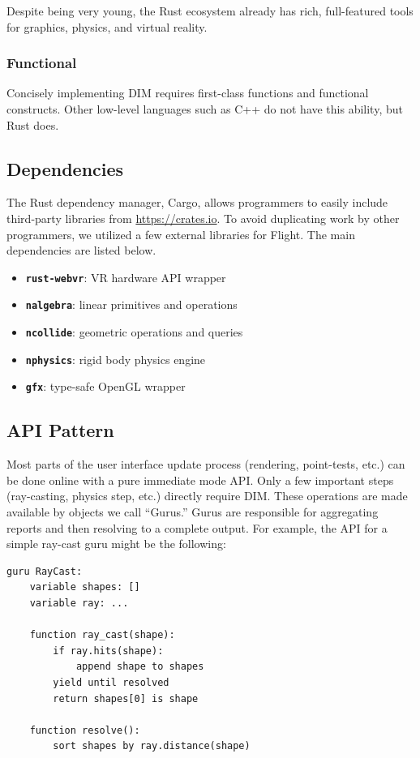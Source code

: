 \documentclass[conference,12pt]{IEEEtran}
\begin{document}
Despite being very young, the Rust ecosystem already has rich, full-featured
tools for graphics, physics, and virtual reality.

\subsubsection{Functional}

Concisely implementing DIM requires first-class functions and functional
constructs. Other low-level languages such as C++ do not have this ability, but
Rust does.

\subsection{Dependencies}

The Rust dependency manager, Cargo, allows programmers to easily include
third-party libraries from \url{https://crates.io}. To avoid duplicating work
by other programmers, we utilized a few external libraries for Flight. The main
dependencies are listed below.
\begin{itemize}
    \item \textbf{\texttt{rust-webvr}}: VR hardware API wrapper
    \item \textbf{\texttt{nalgebra}}: linear primitives and operations
    \item \textbf{\texttt{ncollide}}: geometric operations and queries
    \item \textbf{\texttt{nphysics}}: rigid body physics engine
    \item \textbf{\texttt{gfx}}: type-safe OpenGL wrapper
\end{itemize}

\subsection{API Pattern}

Most parts of the user interface update process (rendering, point-tests, etc.)
can be done online with a pure immediate mode API. Only a few important steps
(ray-casting, physics step, etc.) directly require DIM. These operations are
made available by objects we call ``Gurus.'' Gurus are responsible for
aggregating reports and then resolving to a complete output. For example, the
API for a simple ray-cast guru might be the following:

\begin{verbatim}
guru RayCast:
    variable shapes: []
    variable ray: ...

    function ray_cast(shape):
        if ray.hits(shape):
            append shape to shapes
        yield until resolved
        return shapes[0] is shape

    function resolve():
        sort shapes by ray.distance(shape)
\end{verbatim}
\end{document}
